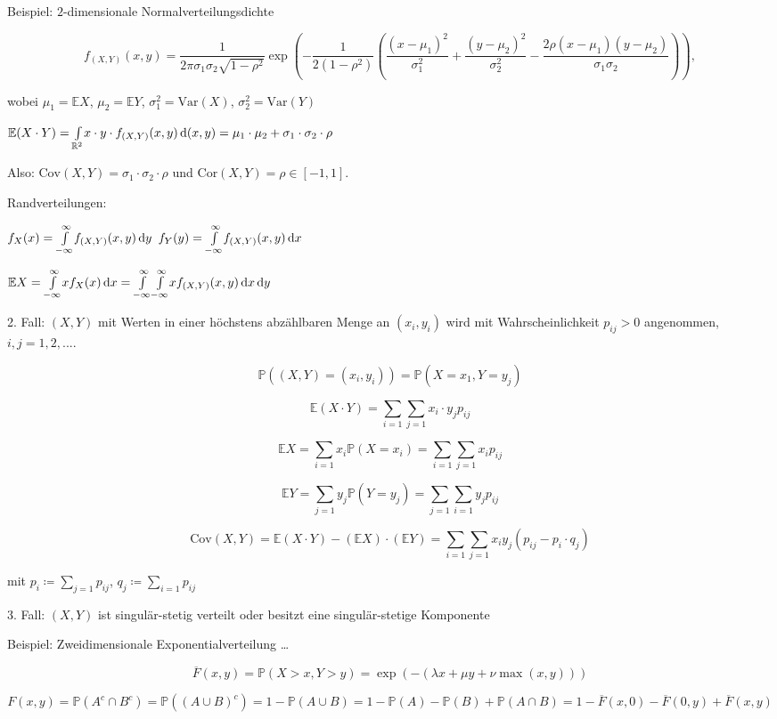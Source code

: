 \documentclass{cheat-sheet}
\renewcommand{\P}{\mathbb{P}} %
\newcommand{\E}{\mathbb{E}} %
\newcommand{\Var}{\mathrm{Var}} %
\newcommand{\Cov}{\mathrm{Cov}} %
\newcommand{\cor}{\mathrm{Cor}} %
\begin{document}
Beispiel: $2$-dimensionale Normalverteilungsdichte

\[ f_{(X,Y)}(x,y) = \frac{1}{2 \pi \sigma_1 \sigma_2 \sqrt{1 - \rho^2}} \exp \left( - \frac{1}{2 (1 - \rho^2)} \left( \frac{(x-\mu_1)^2}{\sigma_1^2} + \frac{(y-\mu_2)^2}{\sigma_2^2} - \frac{2 \rho (x-\mu_1)(y-\mu_2)}{\sigma_1 \sigma_2} \right) \right), \]

wobei $\mu_1 = \E X$, $\mu_2 = \E Y$, $\sigma_1^2 = \Var(X)$, $\sigma_2^2 = \Var(Y)$

$\E (X \cdot Y) = \Int{\R^2}{}{x \cdot y \cdot f_{(X,Y)}(x,y)}{(x, y)} = \mu_1 \cdot \mu_2 + \sigma_1 \cdot \sigma_2 \cdot \rho$

Also: $\Cov(X, Y) = \sigma_1 \cdot \sigma_2 \cdot \rho$ und $\cor(X, Y) = \rho \in [-1, 1]$.

Randverteilungen:

$f_X(x) = {\textstyle \int\limits_{-\infty}^{\infty}} f_{(X,Y)}(x,y) \,\mathrm{d} y$
$f_Y(y) = {\textstyle \int\limits_{-\infty}^{\infty}} f_{(X,Y)}(x,y) \,\mathrm{d} x$

$\E X = \Int{-\infty}{\infty}{x f_X(x)}{x} = \Int{-\infty}{\infty}{\Int{-\infty}{\infty}{x f_{(X,Y)}(x,y)}{x}}{y}$

2. Fall: $(X, Y)$ mit Werten in einer höchstens abzählbaren Menge an $(x_i, y_i)$ wird mit Wahrscheinlichkeit $p_{ij} > 0$ angenommen, $i, j = 1, 2, ...$.

\[ \P((X, Y) = (x_i, y_i)) = \P(X=x_1, Y=y_j) \]

\[ \E(X \cdot Y) = \sum_{i=1} \sum_{j=1} x_i \cdot y_j p_{ij} \]

\[ \E X = \sum_{i=1} x_i \P(X = x_i) = \sum_{i=1} \sum_{j=1} x_i p_{ij} \]

\[ \E Y = \sum_{j=1} y_j \P(Y = y_j) = \sum_{j=1} \sum_{i=1} y_j p_{ij} \]

\[ \Cov(X, Y) = \E (X \cdot Y) - (\E X) \cdot (\E Y) = \sum_{i=1} \sum_{j=1} x_i y_j (p_{ij} - p_i \cdot q_j) \]

mit $p_i \coloneqq \sum_{j=1} p_{ij}$, $q_j \coloneqq \sum_{i=1} p_{ij}$

3. Fall: $(X, Y)$ ist singulär-stetig verteilt oder besitzt eine singulär-stetige Komponente

Beispiel: Zweidimensionale Exponentialverteilung \ldots

\[ \overline{F}(x,y) = \P(X > x, Y > y) = \exp \left( -(\lambda x + \mu y + \nu \max(x,y)) \right) \]

\[ F(x, y) = \P(A^c \cap B^c) = \P((A \cup B)^c) = 1 - \P(A \cup B) = 1 - \P(A) - \P(B) + \P(A \cap B) = 1 - \overline{F}(x,0) - \overline{F}(0,y) + \overline{F}(x,y) \]
\end{document}
